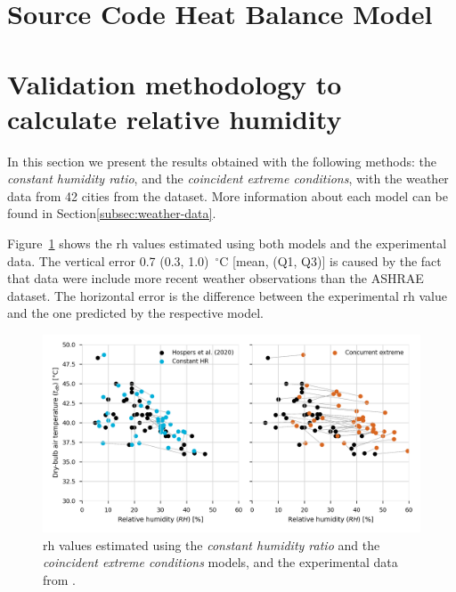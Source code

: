 
\appendix


\section{Source Code Heat Balance Model}\label{sec:python_code}




\section{Validation methodology to calculate relative humidity}\label{sec:validation_rh}

In this section we present the results obtained with the following methods: the \textit{constant humidity ratio}, and the \textit{coincident extreme conditions}, with the weather data from 42 cities from the  dataset.
More information about each model can be found in Section\ref{subsec:weather-data}.

Figure~\ref{fig:scatter_comparison_prediction} shows the \ac{rh} values estimated using both models and the experimental data.
The vertical error 0.7 (0.3, 1.0)~$^{\circ}$C [mean, (Q1, Q3)] is caused by the fact that  data were include more recent weather observations than the ASHRAE dataset.
The horizontal error is the difference between the experimental \ac{rh} value and the one predicted by the respective model.

\begin{figure}[h]
    \centering
    \includegraphics[width=\textwidth]{figures/scatter_comparison_prediction}
    \caption{\ac{rh} values estimated using the \textit{constant humidity ratio} and the \textit{coincident extreme conditions} models, and the experimental data from .}
    \label{fig:scatter_comparison_prediction}
\end{figure}

